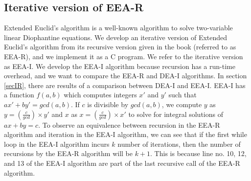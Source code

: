 \documentclass[pdflatex,sn-mathphys-num]{sn-jnl}%
\theoremstyle{thmstyleone}%
\theoremstyle{thmstyletwo}%
\theoremstyle{thmstylethree}%
\begin{document}
\subsection{Iterative version of EEA-R} Extended Euclid's algorithm is a well-known algorithm to solve two-variable linear Diophantine equations. We develop an iterative version of Extended Euclid's algorithm from its recursive version given in the book \cite{cormen2009introduction} (referred to as EEA-R), and we implement it as a C program. We refer to the iterative version as EEA-I. We develop the EEA-I algorithm because recursion has a run-time overhead, and we want to compare the EEA-R and DEA-I algorithms. In section \ref{secIR}, there are results of a comparison between DEA-I and EEA-I. EEA-I has a function $f(a,b)$ which computes integers $x'$ and $y'$ such that $ax'+by'=gcd(a,b)$. If $c$ is divisible by $gcd(a,b)$, we compute $y$ as $y=(\frac{c}{gcd})\times y'$ and $x$ as $x=(\frac{c}{gcd})\times x'$ to solve for integral solutions of $ax+by=c$. To observe an equivalence between recursion in the EEA-R algorithm and iteration in the EEA-I algorithm, we can see that if the first while loop in the EEA-I algorithm incurs $k$ number of iterations, then the number of recursions by the EEA-R algorithm will be $k+1$. This is because line no. 10, 12, and 13 of the EEA-I algorithm are part of the last recursive call of the EEA-R algorithm.


\begin{algorithm}[H]
 \caption{EEA-I}\label{AlgEEA2}















\end{algorithm}
\end{document}

